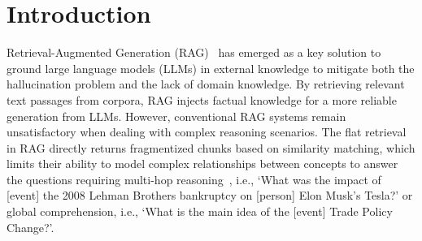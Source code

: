 \documentclass{article}
\begin{document}
\begin{abstract}


\end{abstract}

\section{Introduction}
Retrieval-Augmented Generation (RAG)~\cite{RAG,RAG_survey} has emerged as a key solution to ground large language models (LLMs) in external knowledge to mitigate both the hallucination problem and the lack of domain knowledge. By retrieving relevant text passages from corpora, RAG injects factual knowledge for a more reliable generation from LLMs. However, conventional RAG systems remain unsatisfactory when dealing with complex reasoning scenarios. The flat retrieval in RAG directly returns fragmentized chunks based on similarity matching, which limits their ability to model complex relationships between concepts to answer the questions requiring multi-hop reasoning~\cite{graphrag_survey,dong2023hierarchy}, i.e., `What was the impact of [event] the 2008 Lehman Brothers bankruptcy on [person] Elon Musk's Tesla?' or global comprehension, i.e., `What is the main idea of the [event] Trade Policy Change?'.
\end{document}
